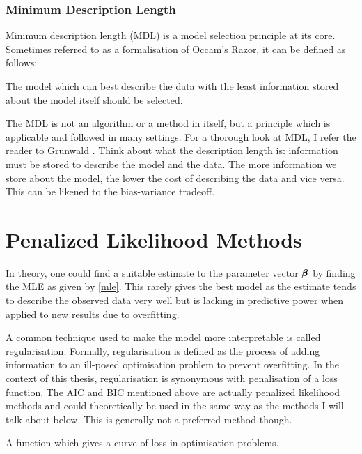 \subsubsection{Minimum Description Length}\label{sec:mdl}

Minimum description length (MDL) is a model selection principle at its core. Sometimes referred to as a formalisation of Occam's Razor, it can be defined as follows:

\begin{definition}\label{def:mdl}
The model which can best describe the data with the least information stored about the model itself should be selected.
\end{definition}

The MDL is not an algorithm or a method in itself, but a principle which is applicable and followed in many settings. For a thorough look at MDL, I refer the reader to Grunwald . Think about what the description length is: information must be stored to describe the model and the data. The more information we store about the model, the lower the cost of describing the data and vice versa. This can be likened to the bias-variance tradeoff.

\section{Penalized Likelihood Methods}\label{sec:penalized-likelihood-methods}

In theory, one could find a suitable estimate to the parameter vector $\boldsymbol{\beta}$ by finding the MLE as given by \cref{mle}. This rarely gives the best model as the estimate tends to describe the observed data very well but is lacking in predictive power when applied to new results due to overfitting.

A common technique used to make the model more interpretable is called regularisation. Formally, regularisation is defined as the process of adding information to an ill-posed optimisation problem to prevent overfitting. In the context of this thesis, regularisation is synonymous with penalisation of a loss function. The AIC and BIC mentioned above are actually penalized likelihood methods and could theoretically be used in the same way as the methods I will talk about below. This is generally not a preferred method though.

\begin{definition}
A function which gives a curve of loss in optimisation problems.
\end{definition}

